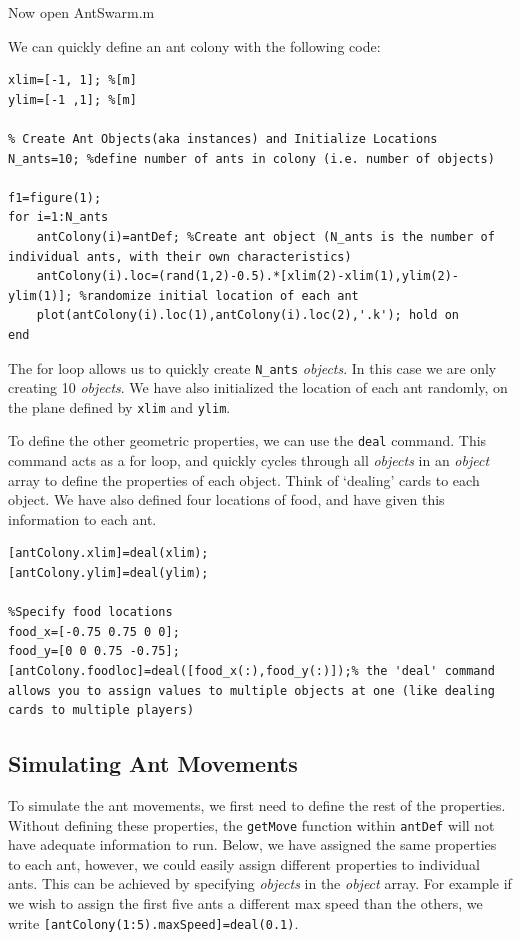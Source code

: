 \documentclass[12pt]{article}
\begin{document}
Now open AntSwarm.m

We can quickly define an ant colony with the following code:

\begin{lstlisting}[frame=single]
%define domain that Ants can exist in
xlim=[-1, 1]; %[m] 
ylim=[-1 ,1]; %[m]

% Create Ant Objects(aka instances) and Initialize Locations
N_ants=10; %define number of ants in colony (i.e. number of objects)

f1=figure(1);
for i=1:N_ants
    antColony(i)=antDef; %Create ant object (N_ants is the number of individual ants, with their own characteristics)
    antColony(i).loc=(rand(1,2)-0.5).*[xlim(2)-xlim(1),ylim(2)-ylim(1)]; %randomize initial location of each ant
    plot(antColony(i).loc(1),antColony(i).loc(2),'.k'); hold on
end

\end{lstlisting}

The for loop allows us to quickly create \lstinline|N_ants| \textit{objects}. In this case we are only creating 10 \textit{objects}. We have also initialized the location of each ant randomly, on the plane defined by \lstinline|xlim| and \lstinline|ylim|.

To define the other geometric properties, we can use the \lstinline|deal| command. This command acts as a for loop, and quickly cycles through all \textit{objects} in an \textit{object} array to define the properties of each object. Think of `dealing' cards to each object.
We have also defined four locations of food, and have given this information to each ant. 

\begin{lstlisting}[frame=single]
% Specify to ant the boundaries of the domain
[antColony.xlim]=deal(xlim);
[antColony.ylim]=deal(ylim);

%Specify food locations
food_x=[-0.75 0.75 0 0];
food_y=[0 0 0.75 -0.75];
[antColony.foodloc]=deal([food_x(:),food_y(:)]);% the 'deal' command allows you to assign values to multiple objects at one (like dealing cards to multiple players)

\end{lstlisting}
 
\subsection{Simulating Ant Movements}
To simulate the ant movements, we first need to define the rest of the properties. Without defining these properties, the \lstinline|getMove| function within \lstinline|antDef| will not have adequate information to run. Below, we have assigned the same properties to each ant, however, we could easily assign different properties to individual ants. This can be achieved by specifying \textit{objects} in the \textit{object} array. For example if we wish to assign the first five ants a different max speed than the others, we write \lstinline|[antColony(1:5).maxSpeed]=deal(0.1)|.
\end{document}
